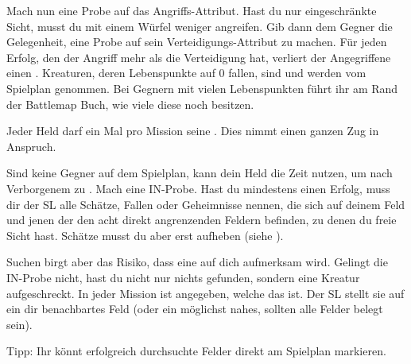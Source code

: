 {			Mach nun eine Probe auf das Angriffs-Attribut. Hast du nur eingeschränkte Sicht, musst du mit einem Würfel weniger angreifen. Gib dann dem Gegner die Gelegenheit, eine Probe auf sein Verteidi\-gungs-Attribut zu machen. Für jeden Erfolg, den der Angriff mehr als die Verteidigung hat, verliert der Angegriffene einen . Kreaturen, deren Lebenspunkte auf 0 fallen, sind  und werden vom Spielplan genommen. Bei Gegnern mit vielen Lebenspunkten führt ihr am Rand der Battlemap Buch, wie viele diese noch besitzen.

			Jeder Held darf ein Mal pro Mission seine . Dies nimmt einen ganzen Zug in Anspruch.

			Sind keine Gegner auf dem Spielplan, kann dein Held die Zeit nutzen, um nach Verborgenem zu . Mach eine IN-Probe. Hast du mindestens einen Erfolg, muss dir der SL alle Schätze, Fallen oder Geheimnisse nennen, die sich auf deinem Feld und jenen der den acht direkt angrenzenden Feldern befinden, zu denen du freie Sicht hast. Schätze musst du aber erst aufheben (siehe ).

			Suchen birgt aber das Risiko, dass eine  auf dich aufmerksam wird. Gelingt die IN-Probe nicht, hast du nicht nur nichts gefunden, sondern eine Kreatur aufgeschreckt. In jeder Mission ist angegeben, welche das ist. Der SL stellt sie auf ein dir benachbartes Feld (oder ein möglichst nahes, sollten alle Felder belegt sein).

			Tipp: Ihr könnt erfolgreich durchsuchte Felder direkt am Spielplan markieren.
}

